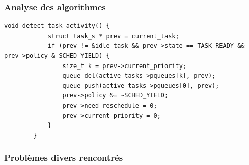 \documentclass{beamer}
\begin{document}
\begin{frame}[fragile]
    \frametitle{Analyse des algorithmes}

    \begin{lstlisting}[caption=Détection de l'activité d'une tâche (IO/CPU)]
        void detect_task_activity() {
            struct task_s * prev = current_task;
            if (prev != &idle_task && prev->state == TASK_READY && prev->policy & SCHED_YIELD) {
                size_t k = prev->current_priority;
                queue_del(active_tasks->pqueues[k], prev);
                queue_push(active_tasks->pqueues[0], prev);
                prev->policy &= ~SCHED_YIELD;
                prev->need_reschedule = 0;
                prev->current_priority = 0;
            }
        }
    \end{lstlisting}
\end{frame}

\begin{frame}
    \frametitle{Problèmes divers rencontrés}


\end{frame}
\end{document}
